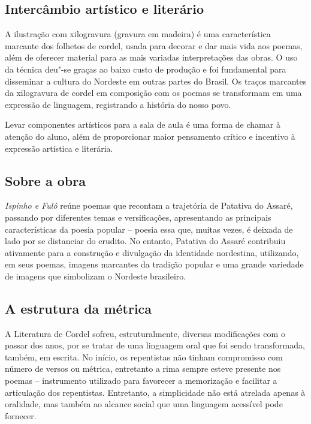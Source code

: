\documentclass[12pt]{extarticle}
\begin{document}
\subsection{Intercâmbio artístico e literário}

A ilustração com xilogravura (gravura em madeira) é uma característica
marcante dos folhetos de cordel, usada para decorar e dar mais vida aos
poemas, além de oferecer material para as mais variadas interpretações
das obras. O uso da técnica deu"-se graças ao baixo custo de produção e
foi fundamental para disseminar a cultura do Nordeste em outras partes
do Brasil. Os traços marcantes da xilogravura de cordel em composição
com os poemas se transformam em uma expressão de linguagem, registrando
a história do nosso povo.

Levar componentes artísticos para a sala de aula é uma forma de chamar à
atenção do aluno, além de proporcionar maior pensamento crítico e
incentivo à expressão artística e literária.


\subsection{Sobre a obra}

\emph{Ispinho e Fulô} reúne poemas que recontam a trajetória de Patativa
do Assaré, passando por diferentes temas e versificações, apresentando
as principais características da poesia popular -- poesia essa que,
muitas vezes, é deixada de lado por se distanciar do erudito. No
entanto, Patativa do Assaré contribuiu ativamente para a construção e
divulgação da identidade nordestina, utilizando, em seus poemas, imagens
marcantes da tradição popular e uma grande variedade de imagens que
simbolizam o Nordeste brasileiro.

\subsection{A estrutura da métrica}

A Literatura de Cordel sofreu, estruturalmente, diversas modificações
com o passar dos anos, por se tratar de uma linguagem oral que foi sendo
transformada, também, em escrita. No início, os repentistas não tinham
compromisso com número de versos ou métrica, entretanto a rima sempre
esteve presente nos poemas -- instrumento utilizado para favorecer a
memorização e facilitar a articulação dos repentistas. Entretanto, a
simplicidade não está atrelada apenas à oralidade, mas também ao alcance
social que uma linguagem acessível pode fornecer.
\end{document}
